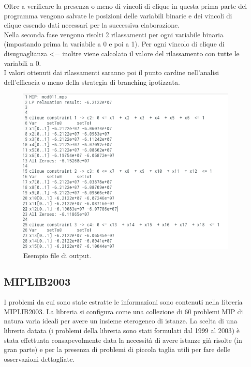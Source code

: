 \documentclass[12pt,a4paper,twoside,openright]{book}
\begin{document}
Oltre a verificare la presenza o meno di vincoli di clique in questa prima parte del programma
vengono salvate le posizioni delle variabili binarie e dei vincoli di clique essendo dati 
necessari per la successiva elaborazione.\\ Nella seconda fase vengono risolti 2 rilassamenti 
per ogni variabile binaria (impostando prima la variabile a 0 e poi a 1). Per ogni vincolo 
di clique di disuguaglianza <= inoltre viene calcolato il valore del rilassamento con tutte le variabili a 0.\\I valori 
ottenuti dai rilassamenti saranno poi il punto cardine nell'analisi dell'efficacia o meno
della strategia di branching ipotizzata. \\
\begin{figure}[ht]
    \centering
    \includegraphics [scale = 0.5]{output_example.png}
    \caption{Esempio file di output.}
    \label{fig:output}
\end{figure}

\subsection{MIPLIB2003}
I problemi da cui sono state estratte le informazioni sono contenuti nella libreria MIPLIB2003.
La libreria si configura come una collezione di 60 problemi MIP di natura varia ideali per avere
un insieme eterogeneo di istanze. La scelta di una libreria datata (i problemi della libreria 
sono stati formulati dal 1999 al 2003) è stata effettuata consapevolmente data la necessità di avere 
istanze già risolte (in gran parte) e per la presenza di problemi di piccola taglia utili per fare 
delle osservazioni dettagliate.
\end{document}
